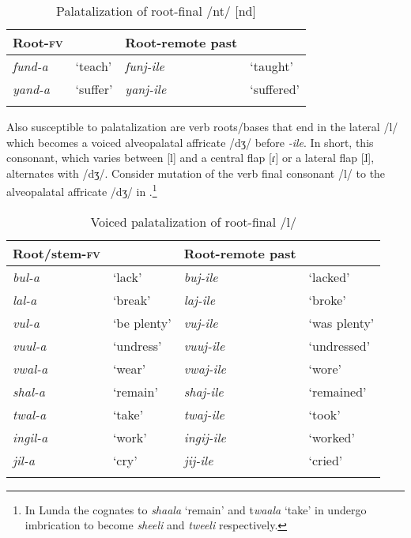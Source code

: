 \documentclass[output=paper]{langsci/langscibook}
\begin{document}
\begin{table}
\begin{tabularx}{.66\textwidth}{XXlX}
\lsptoprule
Root-\textsc{fv} &  & Root-remote past & \\
\midrule
\textit{fund-a} & `teach' & \textit{funj-ile} & `taught' \\
\textit{yand-a} & `suffer' & \textit{yanj-ile} & `suffered' \\

\lspbottomrule
\end{tabularx}

\caption{Palatalization of root-final /nt/ [nd]}
\label{tab:11.kawasha}

 \end{table}


Also susceptible to palatalization are verb roots/bases that end in the lateral /l/ which becomes a voiced alveopalatal affricate /dʒ/ before \textit{-ile}. In short, this consonant, which varies between [l] and a central flap [ɾ] or a lateral flap [ɺ], alternates with /dʒ/. Consider mutation of the verb final consonant /l/ to the alveopalatal affricate /dʒ/ in .\footnote{In Lunda the cognates to \textit{shaala} ‘remain’ and t\textit{waala }‘take’ in  undergo imbrication to become \textit{sheeli} and \textit{tweeli} respectively.}


\begin{table}
\begin{tabularx}{\textwidth}{XXXX}
\lsptoprule
Root/stem-\textsc{fv} &  & Root-remote past & \\
\midrule 
\textit{bul-a} & `lack' & \textit{buj-ile} & `lacked' \\
\textit{lal-a} & `break' & \textit{laj-ile} & `broke' \\
\textit{vul-a} & `be plenty' & \textit{vuj-ile} & `was plenty' \\
\textit{vuul-a} & `undress' & \textit{vuuj-ile} & `undressed' \\
\textit{vwal-a} & `wear' & \textit{vwaj-ile} & `wore' \\
\textit{shal-a} & `remain' & \textit{shaj-ile} & `remained' \\
\textit{twal-a} & `take' & \textit{twaj-ile} & `took' \\
\textit{ingil-a} & `work' & \textit{ingij-ile} & `worked' \\
\textit{jil-a} & `cry' & \textit{jij-ile} & `cried' \\


\lspbottomrule
\end{tabularx}

\caption{Voiced palatalization of root-final /l/}
\label{tab:12.kawasha}

\end{table}
\end{document}
